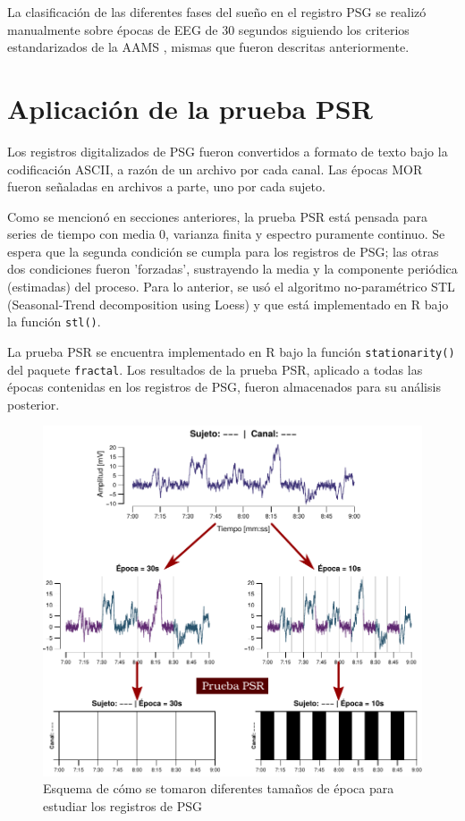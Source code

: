 La clasificación de las diferentes fases del sueño en el registro PSG se realizó manualmente sobre 
épocas de EEG de 30 segundos siguiendo los criterios estandarizados de la AAMS \cite{Hori01}, 
mismas que fueron descritas anteriormente.


\section{Aplicación de la prueba PSR}

Los registros digitalizados de PSG fueron convertidos a formato de texto bajo la codificación 
ASCII, a razón de un archivo por cada canal. 
Las épocas MOR fueron señaladas en archivos a parte, uno por cada sujeto.

Como se mencionó en secciones anteriores, la prueba PSR está pensada para series de tiempo con 
media 0, varianza finita y espectro puramente continuo. Se espera que la segunda condición se 
cumpla para los registros de PSG; las otras dos condiciones fueron 'forzadas', sustrayendo la media 
y la componente periódica (estimadas) del proceso.
Para lo anterior, se usó el algoritmo no-paramétrico STL (Seasonal-Trend decomposition using 
Loess) \cite{Cleveland1990} y que está implementado en R bajo la función \texttt{stl()}.

La prueba PSR se encuentra implementado en R bajo la función \texttt{stationarity()} del paquete 
\texttt{fractal}.
Los resultados de la prueba PSR, aplicado a todas las épocas contenidas en los registros de PSG,
fueron almacenados para su análisis posterior.

\begin{figure}
\centering
\includegraphics[width=\linewidth]{./img_diagramas/epocas_diferentes_v2.pdf}
\caption{Esquema de cómo se tomaron diferentes tamaños de época para estudiar los registros de 
PSG}
\label{epocas_diferentes}
\end{figure}

